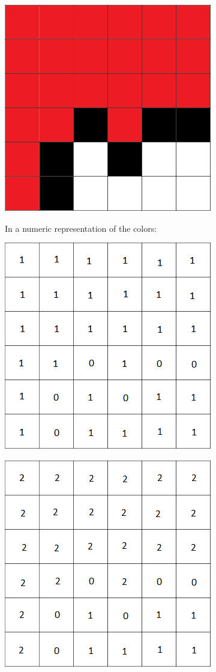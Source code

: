 \documentclass[11pt,oneside]{book}
\makeatletter
\def\maxwidth#1{\ifdim\Gin@nat@width>#1 #1\else\Gin@nat@width\fi}
\makeatother
\begin{document}
\includegraphics[width=\maxwidth{\textwidth}]{bucket2.png}

In a numeric representation of the colors:

\includegraphics[width=\maxwidth{\textwidth}]{bucket3.png}

\includegraphics[width=\maxwidth{\textwidth}]{bucket4.png}
\end{document}

